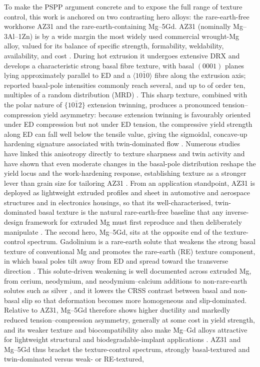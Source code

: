 \documentclass[preprint,12pt]{elsarticle}
\begin{document}
To make the PSPP argument concrete and to expose the full range of texture control, this work is anchored on two contrasting hero alloys: the rare-earth-free workhorse AZ31 and the rare-earth-containing Mg--5Gd. AZ31 (nominally Mg--3Al--1Zn) is by a wide margin the most widely used commercial wrought-Mg alloy, valued for its balance of specific strength, formability, weldability, availability, and cost \cite{Mg-lightweighting-review}. During hot extrusion it undergoes extensive DRX and develops a characteristic strong basal fibre texture, with basal $(0001)$ planes lying approximately parallel to ED and a $\langle 10\bar{1}0\rangle$ fibre along the extrusion axis; reported basal-pole intensities commonly reach several, and up to of order ten, multiples of a random distribution (MRD) \cite{AZ31-extrusion-texture, Agnew-Review-Mg-2006,BOHLEN20072101}. This sharp texture, combined with the polar nature of $\{10\bar{1}2\}$ extension twinning, produces a pronounced tension--compression yield asymmetry: because extension twinning is favourably oriented under ED compression but not under ED tension, the compressive yield strength along ED can fall well below the tensile value, giving the sigmoidal, concave-up hardening signature associated with twin-dominated flow \cite{AZ31-TC-asymmetry,Agnew-Review-Mg-2006,BARNETT20071,KHAN2011688}. Numerous studies have linked this anisotropy directly to texture sharpness and twin activity and have shown that even moderate changes in the basal-pole distribution reshape the yield locus and the work-hardening response, establishing texture as a stronger lever than grain size for tailoring AZ31 \cite{AZ31-TC-asymmetry,Mg-yield-anisotropy-comparative}. From an application standpoint, AZ31 is deployed as lightweight extruded profiles and sheet in automotive and aerospace structures and in electronics housings, so that its well-characterised, twin-dominated basal texture is the natural rare-earth-free baseline that any inverse-design framework for extruded Mg must first reproduce and then deliberately manipulate \cite{Mg-lightweighting-review,Guru2025}. The second hero, Mg--5Gd, sits at the opposite end of the texture-control spectrum. Gadolinium is a rare-earth solute that weakens the strong basal texture of conventional Mg and promotes the rare-earth (RE) texture component, in which basal poles tilt away from ED and spread toward the transverse direction \cite{PENG20121064,Mg-RE-texture-weakening}. This solute-driven weakening is well documented across extruded Mg, from cerium, neodymium, and neodymium--calcium additions to non-rare-earth solutes such as silver \cite{BOHLEN20107092,Nienaber2019,WIESE2021112}, and it lowers the CRSS contrast between basal and non-basal slip so that deformation becomes more homogeneous and slip-dominated. Relative to AZ31, Mg--5Gd therefore shows higher ductility and markedly reduced tension--compression asymmetry, generally at some cost in yield strength, and its weaker texture and biocompatibility also make Mg--Gd alloys attractive for lightweight structural and biodegradable-implant applications \cite{Mg-RE-texture-weakening,Mg-yield-anisotropy-comparative,Mg-Zn-Gd-biodegradable}. AZ31 and Mg--5Gd thus bracket the texture-control spectrum, strongly basal-textured and twin-dominated versus weak- or RE-textured, 
\end{document}
